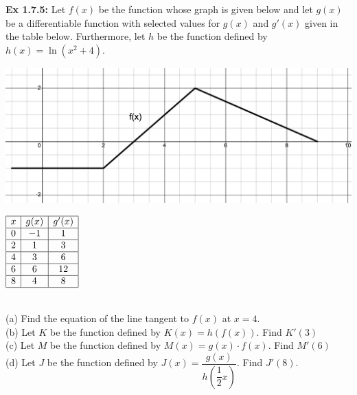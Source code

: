 \begin{tcolorbox}[example]
    \textbf{Ex 1.7.5: } Let $f(x)$ be the function whose graph is given below and let $g(x)$ be a differentiable function with selected values for $g(x)$ and $g'(x)$ given in the table below. Furthermore, let $h$ be the function defined by $h(x) = \ln \left(x^2 + 4\right)$. \\
    \begin{minipage}[t]{0.75\textwidth} \vspace{0pt}%
        \includegraphics[width = \textwidth]{Support/Chapter 1 Graphics/1.7-Graphic3.png}
    \end{minipage} \hfill \begin{minipage}[t]{0.2\textwidth} \vspace{0pt}%
        \def\arraystretch{1.4}
        $\begin{array}{|c|c|c|}
            \hline
            x & g(x) & g'(x) \\ \hline
            0 & -1 & 1 \\ \hline
            2 & 1 & 3 \\ \hline
            4 & 3 & 6 \\ \hline
            6 & 6 & 12 \\ \hline
            8 & 4 & 8 \\
            \hline
        \end{array}$
    \end{minipage} \\[11pt]

    (a) Find the equation of the line tangent to $f(x)$ at $x = 4$. \\[11pt]
    (b) Let $K$ be the function defined by $K(x) = h(f(x))$. Find $K'(3)$ \\[11pt]
    (c) Let $M$ be the function defined by $M(x) = g(x) \cdot f(x)$. Find $M'(6)$ \\[11pt]
    (d) Let $J$ be the function defined by $J(x) = \dfrac{g(x)}{h\left(\dfrac{1}{2}x\right)}$. Find $J'(8)$.
\end{tcolorbox}
